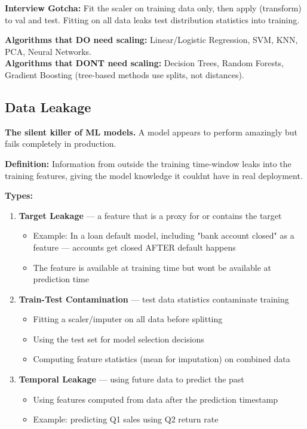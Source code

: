 \documentclass[11pt]{article}
\providecommand{\tightlist}{\setlength{\itemsep}{1pt}\setlength{\parskip}{0pt}}
\begin{document}
\textbf{Interview Gotcha:} Fit the scaler on training data only, then apply (transform) to val and test. Fitting on all data leaks test distribution statistics into training.

\textbf{Algorithms that DO need scaling:} Linear/Logistic Regression, SVM, KNN, PCA, Neural Networks.\\
\textbf{Algorithms that DON\textquotesingle T need scaling:} Decision Trees, Random Forests, Gradient Boosting (tree-based methods use splits, not distances).

\subsection{Data Leakage}\label{data-leakage}

\textbf{The silent killer of ML models.} A model appears to perform amazingly but fails completely in production.

\textbf{Definition:} Information from outside the training time-window leaks into the training features, giving the model knowledge it couldn\textquotesingle t have in real deployment.

\textbf{Types:}

\begin{enumerate}
\def\labelenumi{\arabic{enumi}.}
\item
  \textbf{Target Leakage} --- a feature that is a proxy for or contains the target

  \begin{itemize}
  \tightlist
  \item
    Example: In a loan default model, including "bank account closed" as a feature --- accounts get closed AFTER default happens
  \item
    The feature is available at training time but won\textquotesingle t be available at prediction time
  \end{itemize}
\item
  \textbf{Train-Test Contamination} --- test data statistics contaminate training

  \begin{itemize}
  \tightlist
  \item
    Fitting a scaler/imputer on all data before splitting
  \item
    Using the test set for model selection decisions
  \item
    Computing feature statistics (mean for imputation) on combined data
  \end{itemize}
\item
  \textbf{Temporal Leakage} --- using future data to predict the past

  \begin{itemize}
  \tightlist
  \item
    Using features computed from data after the prediction timestamp
  \item
    Example: predicting Q1 sales using Q2 return rate
  \end{itemize}
\end{enumerate}
\end{document}
